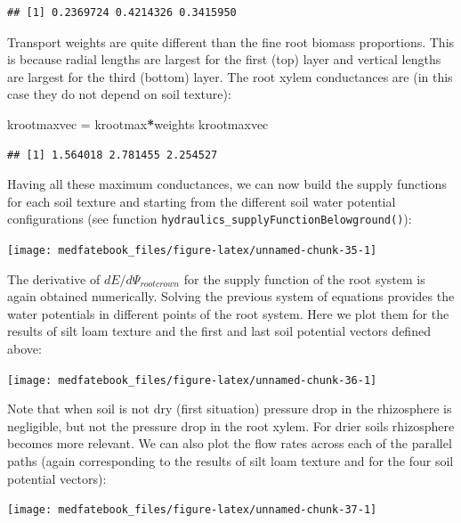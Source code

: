 \documentclass[]{book}
\newenvironment{Shaded}{\begin{snugshade}}{\end{snugshade}}
\newcommand{\StringTok}[1]{\textcolor[rgb]{0.31,0.60,0.02}{#1}}
\newcommand{\OperatorTok}[1]{\textcolor[rgb]{0.81,0.36,0.00}{\textbf{#1}}}
\newcommand{\NormalTok}[1]{#1}
\begin{document}
\begin{verbatim}
## [1] 0.2369724 0.4214326 0.3415950
\end{verbatim}

Transport weights are quite different than the fine root biomass
proportions. This is because radial lengths are largest for the first
(top) layer and vertical lengths are largest for the third (bottom)
layer. The root xylem conductances are (in this case they do not depend
on soil texture):

\begin{Shaded}
\begin{Highlighting}[]
\NormalTok{krootmaxvec =}\StringTok{ }\NormalTok{krootmax}\OperatorTok{*}\NormalTok{weights}
\NormalTok{krootmaxvec}
\end{Highlighting}
\end{Shaded}

\begin{verbatim}
## [1] 1.564018 2.781455 2.254527
\end{verbatim}

Having all these maximum conductances, we can now build the supply
functions for each soil texture and starting from the different soil
water potential configurations (see function
\texttt{hydraulics\_supplyFunctionBelowground()}):

\begin{center}\texttt{[image: medfatebook\_files/figure-latex/unnamed-chunk-35-1]} \end{center}

The derivative of \(dE/d\Psi_{rootcrown}\) for the supply function of
the root system is again obtained numerically. Solving the previous
system of equations provides the water potentials in different points of
the root system. Here we plot them for the results of silt loam texture
and the first and last soil potential vectors defined above:

\begin{center}\texttt{[image: medfatebook\_files/figure-latex/unnamed-chunk-36-1]} \end{center}

Note that when soil is not dry (first situation) pressure drop in the
rhizosphere is negligible, but not the pressure drop in the root xylem.
For drier soils rhizosphere becomes more relevant. We can also plot the
flow rates across each of the parallel paths (again corresponding to the
results of silt loam texture and for the four soil potential vectors):

\begin{center}\texttt{[image: medfatebook\_files/figure-latex/unnamed-chunk-37-1]} \end{center}
\end{document}
